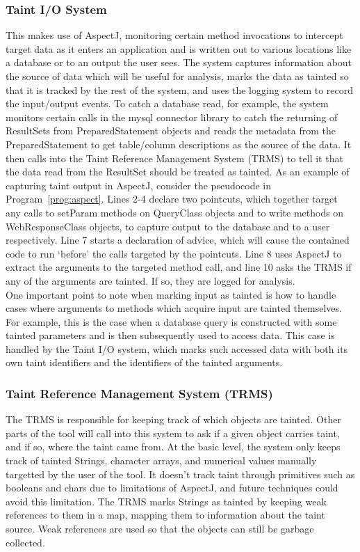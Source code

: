 \documentclass[msc,oneside]{ubcthesis}
\begin{document}
\subsubsection{Taint I/O System} 
This makes use of AspectJ, monitoring certain method invocations to intercept target data as it enters an application and is written out to various locations like a database or to an output the user sees. The system captures information about the source of data which will be useful for analysis, marks the data as tainted so that it is tracked by the rest of the system, and uses the logging system to record the input/output events. To catch a database read, for example, the system monitors certain calls in the mysql connector library to catch the returning of ResultSets from PreparedStatement objects and reads the metadata from the PreparedStatement to get table/column descriptions as the source of the data. It then calls into the Taint Reference Management System (TRMS) to tell it that the data read from the ResultSet should be treated as tainted. As an example of capturing taint output in AspectJ, consider the pseudocode in Program~\ref{prog:aspect}. Lines 2-4 declare two pointcuts, which together target any calls to setParam methods on QueryClass objects and to write methods on WebResponseClass objects, to capture output to the database and to a user respectively. Line 7 starts a declaration of advice, which will cause the contained code to run `before' the calls targeted by the pointcuts. Line 8 uses AspectJ to extract the arguments to the targeted method call, and line 10 asks the TRMS if any of the arguments are tainted. If so, they are logged for analysis. \\

One important point to note when marking input as tainted is how to handle cases where arguments to methods which acquire input are tainted themselves. For example, this is the case when a database query is constructed with some tainted parameters and is then subsequently used to access data. This case is handled by the Taint I/O system, which marks such accessed data with both its own taint identifiers and the identifiers of the tainted arguments.

\subsubsection{Taint Reference Management System (TRMS)} 
The TRMS is responsible for keeping track of which objects are tainted. Other parts of the tool will call into this system to ask if a given object carries taint, and if so, where the taint came from. At the basic level, the system only keeps track of tainted Strings, character arrays, and numerical values manually targetted by the user of the tool. It doesn't track taint through primitives such as booleans and chars due to limitations of AspectJ, and future techniques could avoid this limitation. The TRMS marks Strings as tainted by keeping weak references to them in a map, mapping them to information about the taint source. Weak references are used so that the objects can still be garbage collected.\\
\end{document}

